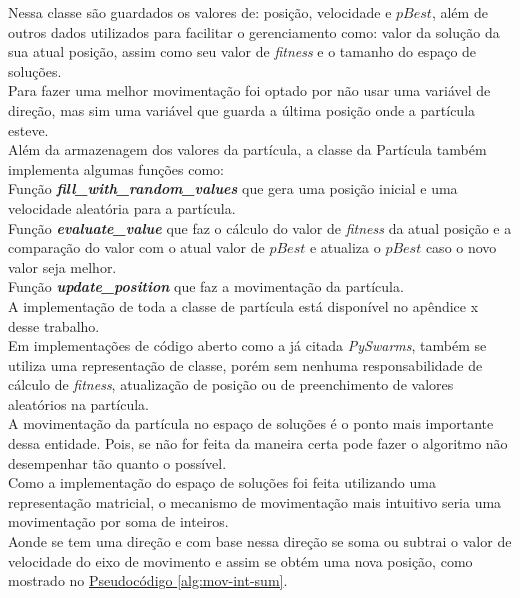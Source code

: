 Nessa classe são guardados os valores de: posição, velocidade e $pBest$, além de outros dados utilizados para facilitar o gerenciamento como: valor da solução da sua atual posição, assim como seu valor de \textit{fitness} e o tamanho do espaço de soluções.\\
\indent Para fazer uma melhor movimentação foi optado por não usar uma variável de direção, mas sim uma variável que guarda a última posição onde a partícula esteve.\\
Além da armazenagem dos valores da partícula, a classe da Partícula também implementa algumas funções como:\\
Função \textbf{\textit{fill\_with\_random\_values}} que gera uma posição inicial e uma velocidade aleatória para a partícula.\\
Função \textbf{\textit{evaluate\_value}} que faz o cálculo do valor de \textit{fitness} da atual posição e a comparação do valor com o atual valor de $pBest$ e atualiza o $pBest$ caso o novo valor seja melhor.\\
Função \textbf{\textit{update\_position}} que faz a movimentação da partícula.\\
\noindent A implementação de toda a classe de partícula está disponível no apêndice x desse trabalho.\\
\indent Em implementações de código aberto como a já citada \textit{PySwarms}, também se utiliza uma representação de classe, porém sem nenhuma responsabilidade de cálculo de \textit{fitness}, atualização de posição ou de preenchimento de valores aleatórios na partícula.\\
%
\indent A movimentação da partícula no espaço de soluções é o ponto mais importante dessa entidade. Pois, se não for feita da maneira certa pode fazer o algoritmo não desempenhar tão quanto o possível.\\
\indent Como a implementação do espaço de soluções foi feita utilizando uma representação matricial, o mecanismo de movimentação mais intuitivo seria uma movimentação por soma de inteiros.\\
\indent Aonde se tem uma direção e com base nessa direção se soma ou subtrai o valor de velocidade do eixo de movimento e assim se obtém uma nova posição, como mostrado no 
\hyperref[alg:mov-int-sum]{Pseudocódigo \ref{alg:mov-int-sum}}.\hfill

